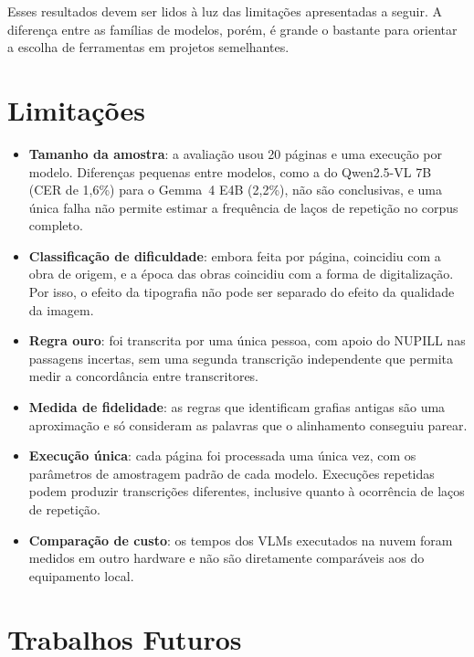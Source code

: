 \documentclass[noabntexcite,oneside]{ufsc-thesis-rn46-2019}
\begin{document}
Esses resultados devem ser lidos à luz das limitações apresentadas a seguir. A diferença
entre as famílias de modelos, porém, é grande o bastante para orientar a escolha de
ferramentas em projetos semelhantes.

\section{Limitações}
\label{sec:limitacoes}

\begin{itemize}
    \item \textbf{Tamanho da amostra}: a avaliação usou 20 páginas e uma execução por
    modelo. Diferenças pequenas entre modelos, como a do Qwen2.5-VL 7B (CER de 1,6\%) para
    o Gemma~4 E4B (2,2\%), não são conclusivas, e uma única falha não permite estimar a
    frequência de laços de repetição no corpus completo.

    \item \textbf{Classificação de dificuldade}: embora feita por página, coincidiu com a
    obra de origem, e a época das obras coincidiu com a forma de digitalização. Por isso, o
    efeito da tipografia não pode ser separado do efeito da qualidade da imagem.

    \item \textbf{Regra ouro}: foi transcrita por uma única pessoa, com apoio do NUPILL nas
    passagens incertas, sem uma segunda transcrição independente que permita medir a
    concordância entre transcritores.

    \item \textbf{Medida de fidelidade}: as regras que identificam grafias antigas são uma
    aproximação e só consideram as palavras que o alinhamento conseguiu parear.

    \item \textbf{Execução única}: cada página foi processada uma única vez, com os
    parâmetros de amostragem padrão de cada modelo. Execuções repetidas podem produzir
    transcrições diferentes, inclusive quanto à ocorrência de laços de repetição.

    \item \textbf{Comparação de custo}: os tempos dos VLMs executados na nuvem foram
    medidos em outro hardware e não são diretamente comparáveis aos do equipamento local.
\end{itemize}

\section{Trabalhos Futuros}
\end{document}
